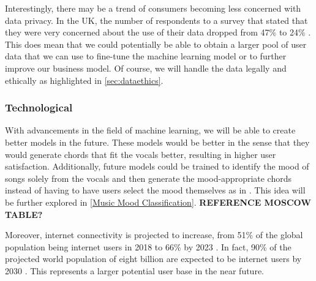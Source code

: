   Interestingly, there may be a trend of consumers becoming less concerned with data privacy. In the UK, the number of respondents to a survey that stated that they were very concerned about the use of their data dropped from 47\% to 24\% \cite{DeloitteData}. This does mean that we could potentially be able to obtain a larger pool of user data that we can use to fine-tune the machine learning model or to further improve our business model. Of course, we will handle the data legally and ethically as highlighted in \cref{sec:dataethics}.

  \subsubsection{Technological}
  With advancements in the field of machine learning, we will be able to create better models in the future. These models would be better in the sense that they would generate chords that fit the vocals better, resulting in higher user satisfaction. Additionally, future models could be trained to identify the mood of songs solely from the vocals and then generate the mood-appropriate chords instead of having to have users select the mood themselves as in \cite{MySong}. This idea will be further explored in \cref{Music Mood Classification}. \textbf{REFERENCE MOSCOW TABLE?}

  Moreover, internet connectivity is projected to increase, from 51\% of the global population being internet users in 2018 to 66\% by 2023 \cite{cisco_2022}. In fact, 90\% of the projected world population of eight billion are expected to be internet users by 2030 \cite{cybersecurityventures}. This represents a larger potential user base in the near future.

